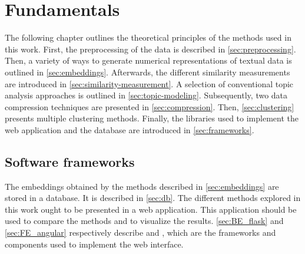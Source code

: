 \chapter{Fundamentals}\label{ch:methodology} %

The following chapter outlines the theoretical principles of the methods used in this work.
First, the preprocessing of the data is described in \autoref{sec:preprocessing}.
Then, a variety of ways to generate numerical representations of textual data is outlined in \autoref{sec:embeddings}.
Afterwards, the different similarity measurements are introduced in \autoref{sec:similarity-measurement}.
A selection of conventional topic analysis approaches is outlined in \autoref{sec:topic-modeling}.
Subsequently, two data compression techniques are presented in \autoref{sec:compression}.
Then, \autoref{sec:clustering} presents multiple clustering methods.
Finally, the libraries used to implement the web application and the database are introduced in \autoref{sec:frameworks}.




















\section{Software frameworks}\label{sec:frameworks}

The embeddings obtained by the methods described in \autoref{sec:embeddings} are stored in a \databaseName{} database.
It is described in \autoref{sec:db}.
The different methods explored in this work ought to be presented in a web application.
This application should be used to compare the methods and to visualize the results.
\autoref{sec:BE_flask} and \autoref{sec:FE_angular} respectively describe \flask{} and \angular{}, 
which are the frameworks and components used to implement the web interface.






